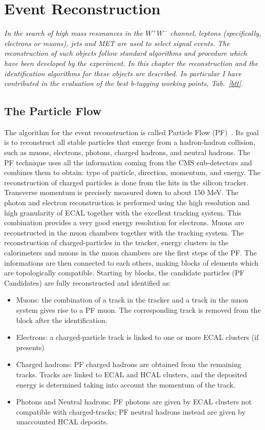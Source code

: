 \chapter{Event Reconstruction}
\label{cap4}

\textit{In the search of high mass resonances in the $W^+W^-$ channel, leptons (specifically, electrons or muons), jets and MET are used  to select signal events.
The reconstruction of such objects follow standard algorithms and procedure which have been
developed by the experiment. In this chapter the reconstruction  and the identification algorithms for these objects are described. 
In particular I have contributed in the evaluation of the best b-tagging working points, Tab.~\ref{btt}.}

\section{The Particle Flow}
\label{PFt}
The algorithm for the event reconstruction is called Particle Flow (PF)~\cite{CMS-PAS-PFT-09-001}. Its goal is to reconstruct all stable particles that emerge from a hadron-hadron collision, such as muons, electrons, photons, charged hadrons, and neutral hadrons. The PF technique uses all the information coming from the 
CMS sub-detectors and combines them to obtain: type of particle, direction, momentum, and energy.
The reconstruction of charged particles is done from the hits in the silicon tracker. 
Transverse momentum is precisely measured down to about 150 MeV.
The photon and electron reconstruction is performed using the high resolution and high granularity of ECAL together with the excellent tracking system. 
This combination provides a very good energy resolution for electrons. Muons are reconstructed in the muon chambers together with the tracking system.
The reconstruction of charged-particles in the tracker, energy clusters in the calorimeters and muons in the muon chambers are the first steps of the PF. The informations are then connected to each others, making blocks of elements which are topologically compatible.
Starting by blocks, the candidate particles (PF Candidates) are fully reconstructed and identified as:
\begin{itemize}
\item Muons: the combination of a track in the tracker and a track in the muon system gives rise to a PF muon. The corresponding track is removed from the block after the identification.
\item Electrons: a charged-particle track is linked to one or more ECAL clusters (if presents)
\item Charged hadrons: PF charged hadrons are obtained from the remaining tracks. Tracks 
are linked to ECAL and HCAL clusters, and the deposited energy is determined taking into
account the momentum of the track.
\item Photons and Neutral hadrons: PF photons are given by ECAL clusters not compatible with charged-tracks; PF
neutral hadrons instead are given by unaccounted HCAL deposits.
\end{itemize}
